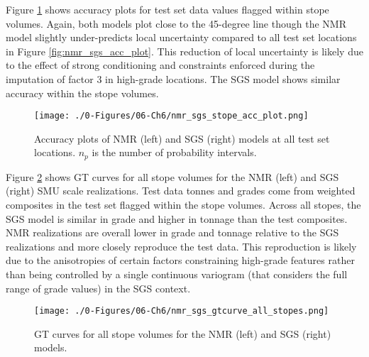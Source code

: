 Figure \ref{fig:nmr_sgs_stope_acc_plot} shows accuracy plots for test set data values flagged within stope volumes. Again, both models plot close to the 45-degree line though the \gls{NMR} model slightly under-predicts local uncertainty compared to all test set locations in Figure \ref{fig:nmr_sgs_acc_plot}. This reduction of local uncertainty is likely due to the effect of strong conditioning and constraints enforced during the imputation of factor 3 in high-grade locations. The \gls{SGS} model shows similar accuracy within the stope volumes.

\begin{figure}[htb!]
    \centering
    \texttt{[image: ./0-Figures/06-Ch6/nmr\_sgs\_stope\_acc\_plot.png]}
    \caption{Accuracy plots of  \gls{NMR} (left) and \gls{SGS} (right) models at all test set locations. $n_{p}$ is the number of probability intervals. }
    \label{fig:nmr_sgs_stope_acc_plot}
\end{figure}

Figure \ref{fig:nmr_sgs_gtcurve_all_stopes} shows \gls{GT} curves for all stope volumes for the \gls{NMR} (left) and \gls{SGS} (right) \gls{SMU} scale realizations. Test data tonnes and grades come from weighted composites in the test set flagged within the stope volumes. Across all stopes, the \gls{SGS} model is similar in grade and higher in tonnage than the test composites. \gls{NMR} realizations are overall lower in grade and tonnage relative to the \gls{SGS} realizations and more closely reproduce the test data. This reproduction is likely due to the anisotropies of certain factors constraining high-grade features rather than being controlled by a single continuous variogram (that considers the full range of grade values) in the \gls{SGS} context.

\begin{figure}[htb!]
    \centering
    \texttt{[image: ./0-Figures/06-Ch6/nmr\_sgs\_gtcurve\_all\_stopes.png]}
    \caption{\Gls{GT} curves for all stope volumes for the \gls{NMR} (left) and \gls{SGS} (right) models.}
    \label{fig:nmr_sgs_gtcurve_all_stopes}
\end{figure}

